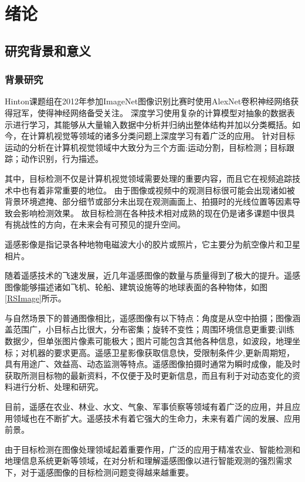 
\chapter{绪论}

\section{研究背景和意义}

\subsection{背景研究}

Hinton课题组在2012年参加ImageNet图像识别比赛时使用AlexNet\cite{AlexNet}卷积神经网络获得冠军，使得神经网络备受关注。
深度学习使用复杂的计算模型对抽象的数据表示进行学习，其能够从大量输入数据中分析并归纳出整体结构并加以分类概括。如今，在计算机视觉等领域的诸多分类问题上深度学习有着广泛的应用。
针对目标运动的分析在计算机视觉领域中大致分为三个方面:运动分割，目标检测；目标跟踪；动作识别，行为描述。

其中，目标检测不仅是计算机视觉领域需要处理的重要内容，而且它在视频追踪技术中也有着非常重要的地位。
由于图像或视频中的观测目标很可能会出现诸如被背景环境遮掩、部分细节或部分未出现在观测画面上、拍摄时的光线位置等因素导致会影响检测效果。
故目标检测在各种技术相对成熟的现在仍是诸多课题中很具有挑战性的方向，在未来会有可预见的提升空间。

遥感影像是指记录各种地物电磁波大小的胶片或照片，它主要分为航空像片和卫星相片。

随着遥感技术的飞速发展，近几年遥感图像的数量与质量得到了极大的提升。遥感图像能够描述诸如飞机、轮船、建筑设施等的地球表面的各种物体，如图\ref{RSImage}所示。

与自然场景下的普通图像相比，遥感图像有以下特点：角度是从空中拍摄；图像涵盖范围广，小目标占比很大，分布密集；旋转不变性；周围环境信息更重要;训练数据少，但单张图片像素可能极大；图片可能包含其他各种信息，如波段，地理坐标；对机器的要求更高。遥感卫星影像获取信息快，受限制条件少,更新周期短，具有用途广、效益高、动态监测等特点。遥感图像拍摄时通常为瞬时成像，能及时获取所测目标物的最新资料，不仅便于及时更新信息，而且有利于对动态变化的资料进行分析、处理和研究。

目前，遥感在农业、林业、水文、气象、军事侦察等领域有着广泛的应用，并且应用领域也在不断扩大。遥感技术有着它强大的生命力，未来有着广阔的发展、应用前景。

由于目标检测在图像处理领域起着重要作用，广泛的应用于精准农业、智能检测和地理信息系统更新等领域，在对分析和理解遥感图像以进行智能观测的强烈需求下，对于遥感图像的目标检测问题变得越来越重要。

